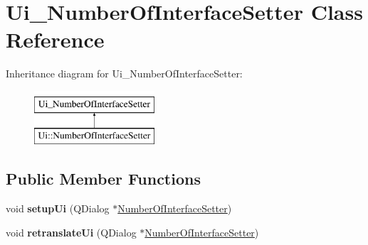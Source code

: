 \hypertarget{class_ui___number_of_interface_setter}{\section{Ui\-\_\-\-Number\-Of\-Interface\-Setter Class Reference}
\label{class_ui___number_of_interface_setter}
}
Inheritance diagram for Ui\-\_\-\-Number\-Of\-Interface\-Setter\-:\begin{figure}[H]
\begin{center}
\leavevmode
\includegraphics[height=2.000000cm]{class_ui___number_of_interface_setter}
\end{center}
\end{figure}
\subsection*{Public Member Functions}
\begin{DoxyCompactItemize}
\item 
\hypertarget{class_ui___number_of_interface_setter_a2ab8bfe7de5c74c9334c82df0339f686}{void {\bfseries setup\-Ui} (Q\-Dialog $\ast$\hyperlink{class_number_of_interface_setter}{Number\-Of\-Interface\-Setter})}\label{class_ui___number_of_interface_setter_a2ab8bfe7de5c74c9334c82df0339f686}

\item 
\hypertarget{class_ui___number_of_interface_setter_a05a200283a29290d27e9ff4dd7f77898}{void {\bfseries retranslate\-Ui} (Q\-Dialog $\ast$\hyperlink{class_number_of_interface_setter}{Number\-Of\-Interface\-Setter})}\label{class_ui___number_of_interface_setter_a05a200283a29290d27e9ff4dd7f77898}

\end{DoxyCompactItemize}
